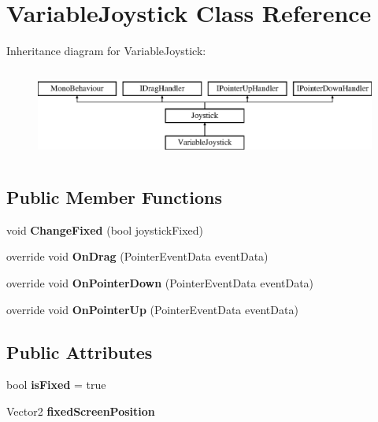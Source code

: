 \hypertarget{class_variable_joystick}{}\section{Variable\+Joystick Class Reference}
\label{class_variable_joystick}
Inheritance diagram for Variable\+Joystick\+:\begin{figure}[H]
\begin{center}
\leavevmode
\includegraphics[height=3.000000cm]{class_variable_joystick}
\end{center}
\end{figure}
\subsection*{Public Member Functions}
\begin{DoxyCompactItemize}
\item 
\mbox{\label{class_variable_joystick_aeb872ac02d68c91d77faa4438a82eb47}} 
void {\bfseries Change\+Fixed} (bool joystick\+Fixed)
\item 
\mbox{\label{class_variable_joystick_ae21ea95e4c38d9846a51c1c73813a43a}} 
override void {\bfseries On\+Drag} (Pointer\+Event\+Data event\+Data)
\item 
\mbox{\label{class_variable_joystick_acc8ccf667db58a334dbabc60b661dee0}} 
override void {\bfseries On\+Pointer\+Down} (Pointer\+Event\+Data event\+Data)
\item 
\mbox{\label{class_variable_joystick_afa9bf76fbfbffefa6ca1c39badfcb591}} 
override void {\bfseries On\+Pointer\+Up} (Pointer\+Event\+Data event\+Data)
\end{DoxyCompactItemize}
\subsection*{Public Attributes}
\begin{DoxyCompactItemize}
\item 
\mbox{\label{class_variable_joystick_af2091db497b0a0b5a4160f43cafb340e}} 
bool {\bfseries is\+Fixed} = true
\item 
\mbox{\label{class_variable_joystick_a962d78c7313b87cd05d203ba97f4c23d}} 
Vector2 {\bfseries fixed\+Screen\+Position}
\end{DoxyCompactItemize}
